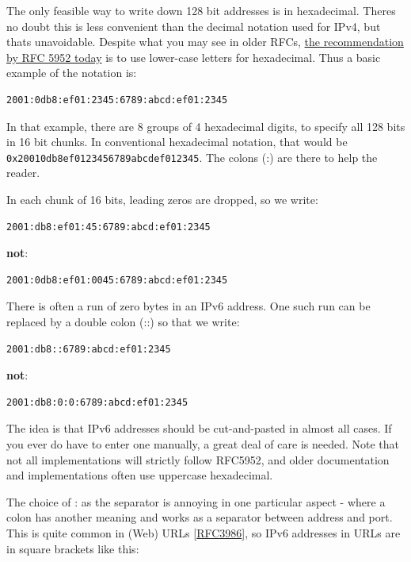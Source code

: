 \documentclass[
]{article}
\begin{document}
The only feasible way to write down 128 bit addresses is in hexadecimal.
There\textquotesingle s no doubt this is less convenient than the
decimal notation used for IPv4, but that\textquotesingle s unavoidable.
Despite what you may see in older RFCs,
\href{https://www.rfc-editor.org/info/rfc5952}{the recommendation by RFC
5952 today} is to use lower-case letters for hexadecimal. Thus a basic
example of the notation is:

\begin{verbatim}
2001:0db8:ef01:2345:6789:abcd:ef01:2345
\end{verbatim}

In that example, there are 8 groups of 4 hexadecimal digits, to specify
all 128 bits in 16 bit chunks. In conventional hexadecimal notation,
that would be \texttt{0x20010db8ef0123456789abcdef012345}. The colons
(\textquotesingle:\textquotesingle) are there to help the reader.

In each chunk of 16 bits, leading zeros are dropped, so we write:

\begin{verbatim}
2001:db8:ef01:45:6789:abcd:ef01:2345
\end{verbatim}

\textbf{not}:

\begin{verbatim}
2001:0db8:ef01:0045:6789:abcd:ef01:2345
\end{verbatim}

There is often a run of zero bytes in an IPv6 address. One such run can
be replaced by a double colon (\textquotesingle::\textquotesingle) so
that we write:

\begin{verbatim}
2001:db8::6789:abcd:ef01:2345
\end{verbatim}

\textbf{not}:

\begin{verbatim}
2001:db8:0:0:6789:abcd:ef01:2345
\end{verbatim}

The idea is that IPv6 addresses should be cut-and-pasted in almost all
cases. If you ever do have to enter one manually, a great deal of care
is needed. Note that not all implementations will strictly follow
RFC5952, and older documentation and implementations often use uppercase
hexadecimal.

The choice of \textquotesingle:\textquotesingle{} as the separator is
annoying in one particular aspect - where a colon has another meaning
and works as a separator between address and port. This is quite common
in (Web) URLs
{[}\href{https://www.rfc-editor.org/info/rfc3986}{RFC3986}{]}, so IPv6
addresses in URLs are in square brackets like this:
\end{document}
